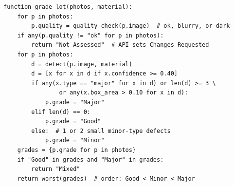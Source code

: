 \begin{lstlisting}[basicstyle=\footnotesize\ttfamily,columns=flexible,keepspaces=true,frame=single,
  caption={Pseudocode of the condition engine (M-03)},label=lst:m-03]
function grade_lot(photos, material):
    for p in photos:
        p.quality = quality_check(p.image)  # ok, blurry, or dark
    if any(p.quality != "ok" for p in photos):
        return "Not Assessed"  # API sets Changes Requested
    for p in photos:
        d = detect(p.image, material)
        d = [x for x in d if x.confidence >= 0.40]
        if any(x.type == "major" for x in d) or len(d) >= 3 \
                or any(x.box_area > 0.10 for x in d):
            p.grade = "Major"
        elif len(d) == 0:
            p.grade = "Good"
        else:  # 1 or 2 small minor-type defects
            p.grade = "Minor"
    grades = {p.grade for p in photos}
    if "Good" in grades and "Major" in grades:
        return "Mixed"
    return worst(grades)  # order: Good < Minor < Major
\end{lstlisting}

